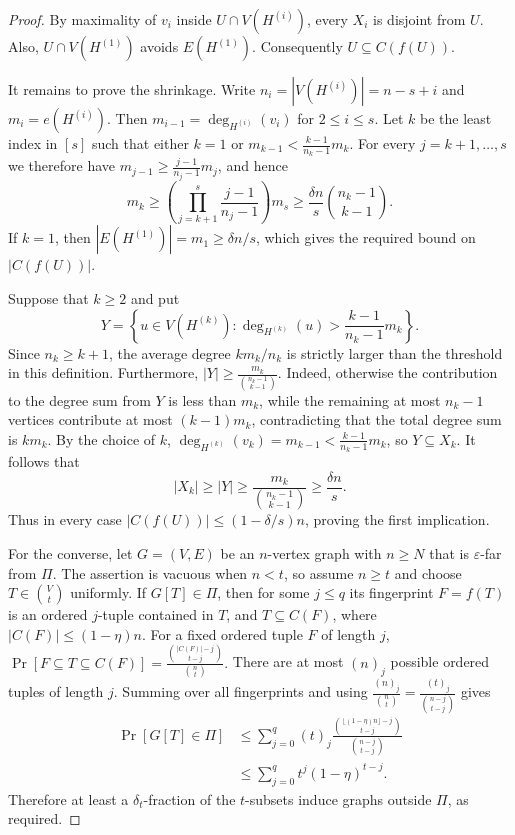 \documentclass[10pt,a4paper]{amsart}
\begin{document}
\begin{proof}
By maximality of $v_i$ inside $U\cap V(H^{(i)})$, every $X_i$ is disjoint from
$U$.  Also, $U\cap V(H^{(1)})$ avoids $E(H^{(1)})$.  Consequently
$U\subseteq C(f(U))$.

It remains to prove the shrinkage.  Write
$n_i=|V(H^{(i)})|=n-s+i$ and $m_i=e(H^{(i)})$.  Then
$m_{i-1}=\deg_{H^{(i)}}(v_i)$ for $2\leq i\leq s$.  Let $k$ be the least
index in $[s]$ such that either $k=1$ or
\(m_{k-1}<\frac{k-1}{n_k-1}m_k.\)
For every $j=k+1,\ldots,s$ we therefore have
$m_{j-1}\geq\frac{j-1}{n_j-1}m_j$, and hence
\[
m_k
\geq
\left(\prod_{j=k+1}^{s}\frac{j-1}{n_j-1}\right)m_s
\geq
\frac{\delta n}{s}\binom{n_k-1}{k-1}.
\]
If $k=1$, then $|E(H^{(1)})|=m_1\geq\delta n/s$, which gives the required
bound on $|C(f(U))|$.

Suppose that $k\geq2$ and put
\[
Y=\left\{u\in V(H^{(k)}):
\deg_{H^{(k)}}(u)>\frac{k-1}{n_k-1}m_k\right\}.
\]
Since $n_k\geq k+1$, the average degree $km_k/n_k$ is strictly larger than
the threshold in this definition.  Furthermore,
\(|Y|\geq\frac{m_k}{\binom{n_k-1}{k-1}}.\)
Indeed, otherwise the contribution to the degree sum from $Y$ is less than
$m_k$, while the remaining at most $n_k-1$ vertices contribute at most
$(k-1)m_k$, contradicting that the total degree sum is $km_k$.  By the choice
of $k$,
$\deg_{H^{(k)}}(v_k)=m_{k-1}<\frac{k-1}{n_k-1}m_k$, so
$Y\subseteq X_k$.  It follows that
\[
|X_k|\geq |Y|
\geq\frac{m_k}{\binom{n_k-1}{k-1}}
\geq\frac{\delta n}{s}.
\]
Thus in every case $|C(f(U))|\leq(1-\delta/s)n$, proving the first
implication.

For the converse, let $G=(V,E)$ be an $n$-vertex graph with $n\geq N$ that is
$\varepsilon$-far from $\Pi$.  The assertion is vacuous when $n<t$, so assume
$n\geq t$ and choose $T\in\binom Vt$ uniformly.  If $G[T]\in\Pi$, then for
some $j\leq q$ its fingerprint $F=f(T)$ is an ordered $j$-tuple contained in
$T$, and
\(T\subseteq C(F)\), where $|C(F)|\leq(1-\eta)n$.  For a fixed ordered tuple
$F$ of length $j$,
\(\Pr[F\subseteq T\subseteq C(F)] =\frac{\binom{|C(F)|-j}{t-j}}{\binom nt}.\)
There are at most $(n)_j$ possible ordered tuples of length $j$.  Summing over
all fingerprints and using
\(\frac{(n)_j}{\binom nt} =\frac{(t)_j}{\binom{n-j}{t-j}}\)
gives
\begin{align*}
\Pr[G[T]\in\Pi]
&\leq
\sum_{j=0}^{q}(t)_j
\frac{\binom{\lfloor(1-\eta)n\rfloor-j}{t-j}}
{\binom{n-j}{t-j}}\\
&\leq
\sum_{j=0}^{q}t^j(1-\eta)^{t-j}.
\end{align*}
Therefore at least a $\delta_t$-fraction of the $t$-subsets induce graphs
outside $\Pi$, as required.
\end{proof}
\end{document}
